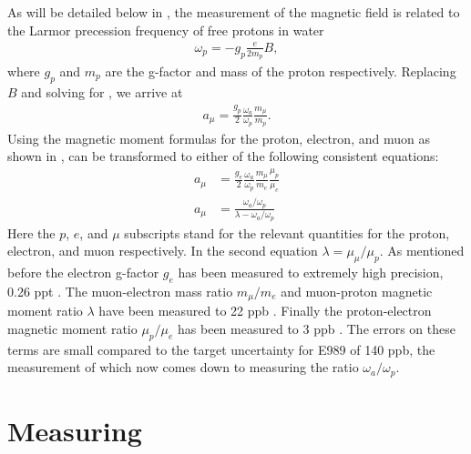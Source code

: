 As will be detailed below in , the measurement of the magnetic field is related to the Larmor precession frequency of free protons in water 
        \begin{align} \label{eq:wp}
            \omega_{p} = -g_{p} \frac{e}{2m_{p}} B,
        \end{align}
where $g_{p}$ and $m_{p}$ are the g-factor and mass of the proton respectively. Replacing $B$ and solving for \amu, we arrive at 
        \begin{align} \label{eq:amu}
            a_{\mu} = \frac{g_{p}}{2} \frac{\omega_{a}}{\omega_{p}} \frac{m_{\mu}}{m_{p}}.
        \end{align}
Using the magnetic moment formulas for the proton, electron, and muon as shown in ,  can be transformed to either of the following consistent equations:
        \begin{equation} 
        \begin{aligned} \label{eq:amuratios}
            a_{\mu} &= \frac{g_{e}}{2} \frac{\omega_{a}}{\omega_{p}} \frac{m_{\mu}}{m_{e}} \frac{\mu_{p}}{\mu_{e}} \\ 
            a_{\mu} &= \frac{\omega_{a}/\omega_{p}}{\lambda - \omega_{a}/\omega_{p}}
        \end{aligned}
        \end{equation}
Here the $p$, $e$, and $\mu$ subscripts stand for the relevant quantities for the proton, electron, and muon respectively. In the second equation $\lambda = \mu_{\mu}/\mu_{p}$. As mentioned before the electron g-factor $g_{e}$ has been measured to extremely high precision, 0.26 ppt \cite{ElectronMDM,CODATA}. The muon-electron mass ratio $m_{\mu}/m_{e}$ and muon-proton magnetic moment ratio $\lambda$ have been measured to 22 ppb \cite{CODATA,MuoniumHyperfine}. Finally the proton-electron magnetic moment ratio $\mu_{p}/\mu_{e}$ has been measured to 3 ppb \cite{CODATA}. The errors on these terms are small compared to the target uncertainty for E989 of 140 ppb, the measurement of which now comes down to measuring the ratio $\omega_{a}/\omega_{p}$. 


\section{Measuring \texorpdfstring{\wa}{wa}}
\label{section:WaIntro}

